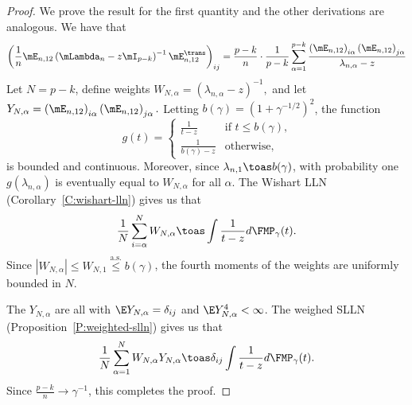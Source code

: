 \begin{proof}
We prove the result for the first quantity and the other derivations are analogous.  We have that
\begin{align*}
    \left(
        \frac{1}{n}
        \mE_{n,12}
        \left(
            \mLambda_n
            -
            z \mI_{p-k}
        \right)^{-1}
        \mE_{n,12}^\trans    
    \right)_{ij}
    =
    \frac{p-k}{n}
    \cdot
    \frac{1}{p-k}
    \sum_{\alpha=1}^{p-k}
        \frac{ \left( \mE_{n,12} \right)_{i\alpha}
               \left( \mE_{n,12} \right)_{j\alpha}
             }
             { \lambda_{n,\alpha} - z }
\end{align*}
Let $N = p-k$, define weights 
\(
    W_{N,\alpha} = (\lambda_{n,\alpha} - z)^{-1},
\)
and let
\(
    Y_{N,\alpha} = \left( \mE_{n,12} \right)_{i\alpha}
                   \left( \mE_{n,12} \right)_{j\alpha}.
\)
Letting $b(\gamma) = \left( 1 + \gamma^{-1/2} \right)^2$, the function
\[
    g(t) 
    = 
    \begin{cases}
        \frac{1}{t - z} 
            &\text{if $t \leq b(\gamma)$,} \\
        \frac{1}{b(\gamma) - z}
            &\text{otherwise,}
    \end{cases}
\]
is bounded and continuous.  Moreover, since $\lambda_{n,1} \toas b(\gamma)$, with probability one $g(\lambda_{n,\alpha})$ is eventually equal to $W_{N,\alpha}$ for all $\alpha$.  The Wishart LLN (Corollary~\ref{C:wishart-lln}) gives us that
\[
    \frac{1}{N}
    \sum_{i=\alpha}^N W_{N,\alpha}
        \toas
            \int
                \frac{1}{t - z} d\FMP_\gamma(t).
\]
Since $| W_{N,\alpha} | \leq W_{N,1} \overset{\text{a.s.}}{\leq} b(\gamma)$, the fourth moments of the weights are uniformly bounded in $N$.  

The $Y_{N,\alpha}$ are all \iid with $\E Y_{N,\alpha} = \delta_{ij}$ and $\E Y_{N,\alpha}^4 < \infty$.  The weighed SLLN (Proposition~\ref{P:weighted-slln}) gives us that
\[
    \frac{1}{N}
    \sum_{\alpha=1}^N
        W_{N,\alpha}
        Y_{N,\alpha}
    \toas
        \delta_{ij}
        \int
            \frac{1}{t - z} d\FMP_\gamma(t).
\]
Since $\frac{p-k}{n} \to \gamma^{-1}$, this completes the proof.
\end{proof}

